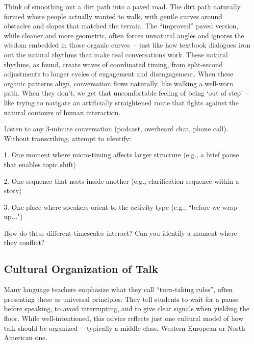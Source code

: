 Think of smoothing out a dirt path into a paved road. The dirt path naturally formed where people actually wanted to walk, with gentle curves around obstacles and slopes that matched the terrain. The ``improved'' paved version, while cleaner and more geometric, often forces unnatural angles and ignores the wisdom embedded in those organic curves~-- just like how textbook dialogues iron out the natural rhythms that make real conversations work. These natural rhythms, as \citet{wilson2005} found, create waves of coordinated timing, from split-second adjustments to longer cycles of engagement and disengagement. When these organic patterns align, conversation flows naturally, like walking a well-worn path. When they don't, we get that uncomfortable feeling of being `out of step'~-- like trying to navigate an artificially straightened route that fights against the natural contours of human interaction.

\begin{tcolorbox}[title=Exercise: Mapping Temporal Layers, colback=white, colframe=blue!75!black, fonttitle=\bfseries]
Listen to any 3-minute conversation (podcast, overheard chat, phone call). Without transcribing, attempt to identify:

1. One moment where micro-timing affects larger structure (e.g., a brief pause that enables topic shift)

2. One sequence that nests inside another (e.g., clarification sequence within a story)

3. One place where speakers orient to the activity type (e.g., ``before we wrap up...")

How do these different timescales interact? Can you identify a moment where they conflict?
\end{tcolorbox}

\subsection{Cultural Organization of Talk} \label{subsec:cultural-org}

Many language teachers emphasize what they call ``turn-taking rules'', often presenting these as universal principles. They tell students to wait for a pause before speaking, to avoid interrupting, and to give clear signals when yielding the floor. While well-intentioned, this advice reflects just one cultural model of how talk should be organized~-- typically a middle-class, Western European or North American one.

